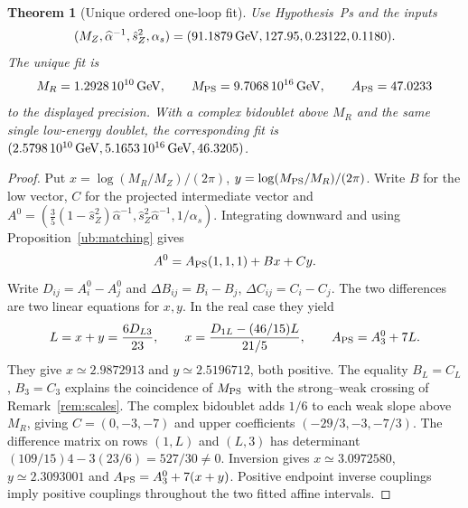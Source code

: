 \documentclass[aps,pra,onecolumn,superscriptaddress,nofootinbib,10pt]{revtex4-2}
\newtheorem{theorem}{Theorem}
\theoremstyle{definition}
\theoremstyle{remark}
\begin{document}
\begin{theorem}[Unique ordered one-loop fit]\label{ub:fit}
Use Hypothesis~Ps and the inputs
\[
 (M_Z,\widehat{\alpha}^{-1},\hat s_Z^2,\alpha_s)
   =(91.1879\,{\rm GeV},127.95,0.23122,0.1180).
\]
The unique fit is
\[
 M_R=1.2928\,10^{10}\,{\rm GeV},\qquad
 M_{\rm PS}=9.7068\,10^{16}\,{\rm GeV},\qquad A_{\rm PS}=47.0233
\]
to the displayed precision. With a complex bidoublet above $M_R$
and the same single low-energy doublet, the corresponding fit is
$(2.5798\,10^{10}\,{\rm GeV},5.1653\,10^{16}\,{\rm GeV},46.3205)$.
\end{theorem}
\begin{proof}
Put $x=\log(M_R/M_Z)/(2\pi)$, $y=\log(M_{\rm PS}/M_R)/(2\pi)$.
Write $B$ for the low vector, $C$ for the projected intermediate vector
and $A^0=(\frac35(1-\hat s_Z^2)\widehat\alpha^{-1},
\hat s_Z^2\widehat\alpha^{-1},1/\alpha_s)$.
Integrating downward and using Proposition~\ref{ub:matching} gives
\[
 A^0=A_{\rm PS}(1,1,1)+Bx+Cy.
\]
Write $D_{ij}=A_i^0-A_j^0$ and $\Delta B_{ij}=B_i-B_j$,
$\Delta C_{ij}=C_i-C_j$. The two differences are two linear equations
for $x,y$. In the real case they yield
\[
 L=x+y=\frac{6D_{L3}}{23},\qquad
 x=\frac{D_{1L}-(46/15)L}{21/5},\qquad
 A_{\rm PS}=A_3^0+7L .
\]
They give $x\simeq2.9872913$ and $y\simeq2.5196712$, both positive.
The equality $B_L=C_L$, $B_3=C_3$ explains the coincidence of $M_{\rm PS}$
with the strong--weak crossing of Remark~\ref{rem:scales}.
The complex bidoublet adds $1/6$ to each weak slope above $M_R$, giving
$C=(0,-3,-7)$ and upper coefficients $(-29/3,-3,-7/3)$. The difference matrix on rows $(1,L)$ and $(L,3)$
has determinant $(109/15)4-3(23/6)=527/30\ne0$.
Inversion gives $x\simeq3.0972580$, $y\simeq2.3093001$ and
$A_{\rm PS}=A_3^0+7(x+y)$. Positive endpoint inverse couplings imply
positive couplings throughout the two fitted affine intervals.
\end{proof}
\end{document}
